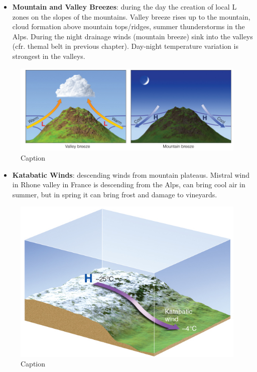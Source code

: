 \documentclass[oneside]{book}
\providecommand{\tightlist}{%
  \setlength{\itemsep}{0pt}\setlength{\parskip}{0pt}}
\begin{document}
\begin{itemize}
\tightlist
\item
  \textbf{Mountain and Valley Breezes}: during the day the creation of
  local L zones on the slopes of the mountains. Valley breeze rises up
  to the mountain, cloud formation above mountain tops/ridges, summer
  thunderstorms in the Alps. During the night drainage winds (mountain
  breeze) sink into the valleys (cfr. themal belt in previous chapter).
  Day-night temperature variation is strongest in the valleys.
\end{itemize}

\begin{figure}

{\centering \includegraphics[width=0.6\linewidth]{figures/Figure426} 

}

\caption{Caption}\label{fig:Mountain}
\end{figure}

\begin{itemize}
\tightlist
\item
  \textbf{Katabatic Winds}: descending winds from mountain plateaus.
  Mistral wind in Rhone valley in France is descending from the Alps,
  can bring cool air in summer, but in spring it can bring frost and
  damage to vineyards.
\end{itemize}

\begin{figure}

{\centering \includegraphics[width=0.6\linewidth]{figures/Figure427} 

}

\caption{Caption}\label{fig:Katabatic}
\end{figure}
\end{document}
